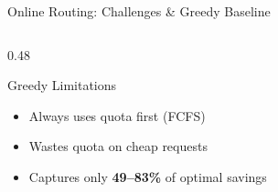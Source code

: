 \documentclass[aspectratio=169,10pt]{beamer}
\begin{document}
\begin{frame}{Online Routing: Challenges \& Greedy Baseline}
\begin{columns}[T]
\begin{column}{0.48\textwidth}
\vspace{0.15cm}
\begin{alertblock}{Greedy Limitations}
\small
\begin{itemize}\setlength{\itemsep}{1pt}
    \item Always uses quota first (FCFS)
    \item \alert{Wastes quota on cheap requests}
    \item Captures only \textbf{49--83\%} of optimal savings
\end{itemize}
\end{alertblock}
\end{column}
\end{columns}
\end{frame}

\end{document}
